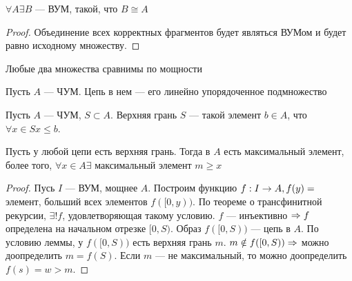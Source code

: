 \begin{theorem}[Цермело]
    \(\forall A \exists B\) --- ВУМ, такой, что \(B \cong A\)
\end{theorem}
\begin{proof}
    Объединение всех корректных фрагментов будет являться ВУМом и будет равно исходному множеству.
\end{proof}

\begin{corollary}
    Любые два множества сравнимы по мощности
\end{corollary}

\begin{definition}
    Пусть \(A\) --- ЧУМ. Цепь в нем --- его линейно упорядоченное подмножество
\end{definition}
\begin{definition}
    Пусть \(A\) --- ЧУМ, \(S \subset A\). Верхняя грань \(S\) --- такой элемент \(b \in A\), что \(\forall x \in S x \le b\).
\end{definition}
\begin{lemma}[Цорна]
    Пусть у любой цепи есть верхняя грань. Тогда в \(A\) есть максимальный элемент, более того, \(\forall x \in A \exists\) максимальный элемент \(m \ge x\)
\end{lemma}
\begin{proof}
    Пусь \(I\) --- ВУМ, мощнее \(A\). Построим функцию \(f: I \rightarrow A, f(y) =\) элемент, больший всех элементов \(f([0, y))\). По теореме о трансфинитной рекурсии, \(\exists! f\), удовлетворяющая такому условию. \(f\) --- инъективно \(\Rightarrow f\) определена на начальном отрезке \([0, S)\). Образ \(f([0, S))\) --- цепь в \(A\). По условию леммы, у \(f([0, S))\) есть верхняя грань \(m\). \(m \notin f([0, S)) \Rightarrow\) можно доопределить \(m = f(S)\). Если \(m\) --- не максимальный, то можно доопределить \(f(s) = w > m\).
\end{proof}